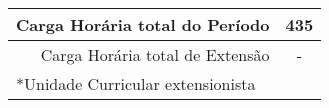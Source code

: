 \begin{tabular}{cccccccc}
\midrule
\multicolumn{7}{r}{Carga Horária total do Período}   & 435 \\ 
\midrule
\multicolumn{7}{r}{Carga Horária total de Extensão}  & -   \\
\bottomrule
\multicolumn{8}{l}{*Unidade Curricular extensionista}


\end{tabular}%
